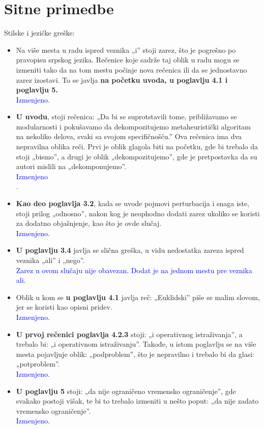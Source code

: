 \documentclass[a4paper]{report}
\newcommand{\odgovor}[1]{\textcolor{blue}{#1}}
\begin{document}
\section{Sitne primedbe}
Stilske i jezičke greške:
\begin{itemize}
 \item Na više mesta u radu ispred veznika „i” stoji zarez, što je pogrešno po pravopisu srpskog jezika. Rečenice koje sadrže taj oblik u radu mogu se izmeniti tako da na tom mestu počinje nova rečenica ili da se jednostavno zarez izostavi. To se javlja \textbf{na početku uvoda, u poglavlju 4.1 i poglavlju 5.}\\
 \odgovor{Izmenjeno.\\}
 
 \item \textbf{U uvodu}, stoji rečenica: „Da bi se suprotstavili tome, približavamo se modularnosti i pokušavamo da dekompozitujemo metaheuristički algoritam na nekoliko delova, svaki sa svojom specifičnošću.” Ova rečenica ima dva nepravilna oblika reči. Prvi je oblik glagola biti na početku, gde bi trebalo da stoji „bismo”, a drugi je oblik „dekompozitujemo”, gde je pretpostavka da su autori mislili na „dekomponujemo”.\\
 \odgovor{Izmenjeno\\}.
 
 \item \textbf{Kao deo poglavlja 3.2}, kada se uvode pojmovi perturbacija i snaga iste, stoji prilog „odnosno”, nakon kog je neophodno dodati zarez ukoliko se koristi za dodatno objašnjenje, kao što je ovde slučaj.\\
 \odgovor{Izmenjeno.\\}
 
 \item \textbf{U poglavlju 3.4} javlja se slična greška, u vidu nedostatka zareza ispred veznika „ali” i „nego”.\\
 \odgovor{Zarez u ovom slučaju nije obavezan. Dodat je na jednom mestu pre veznika ali.\\}
 
 \item Oblik u kom se \textbf{u poglavlju 4.1} javlja reč: „Euklidski” piše se malim slovom, jer se koristi kao opisni pridev.\\
 \odgovor{Izmenjeno.\\}
 \item \textbf{U prvoj rečenici poglavlja 4.2.3} stoji: „i operativnog istraživanja”, a trebalo bi: „i operativnom istraživanju”. Takođe, u istom poglavlju se na više mesta pojavljuje oblik: „podproblem”, što je nepravilno i trebalo bi da glasi: „potproblem”.\\
\odgovor{Izmenjeno.\\}
 
 \item \textbf{U poglavlju 5} stoji: „da nije ograničeno vremensko ograničenje”, gde svakako postoji višak, te bi to trebalo izmeniti u nešto poput: „da nije zadato vremensko ograničenje”.\\
\odgovor{Izmenjeno.\\}
\end{itemize}
\end{document}
